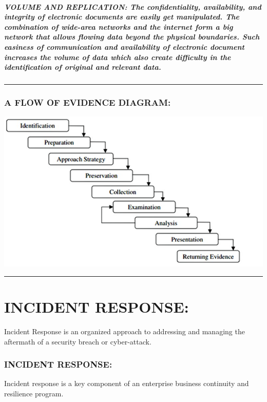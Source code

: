 \documentclass[10pt,british,english]{article}
\begin{document}
\subsubsection{VOLUME AND REPLICATION: The confidentiality, availability, and integrity
of electronic documents are easily get manipulated. The combination
of wide-area networks and the internet form a big network that allows
flowing data beyond the physical boundaries. Such easiness of communication
and availability of electronic document increases the volume of data
which also create difficulty in the identification of original and
relevant data.}

\rule[0.5ex]{1\columnwidth}{1pt}

\section{A FLOW OF EVIDENCE DIAGRAM:}
\begin{center}
\includegraphics[scale=0.5]{Pictures/DF}
\par\end{center}

\rule[0.5ex]{1\columnwidth}{1pt}

\part{INCIDENT RESPONSE: }

Incident Response is an organized approach to addressing and managing
the aftermath of a security breach or cyber-attack.

\section{INCIDENT RESPONSE:}

Incident response is a key component of an enterprise business continuity
and resilience program. 
\end{document}
